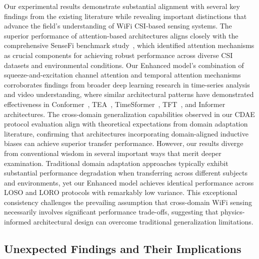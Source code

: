 \documentclass[journal]{IEEEtran}
\begin{document}
Our experimental results demonstrate substantial alignment with several key findings from the existing literature while revealing important distinctions that advance the field's understanding of WiFi CSI-based sensing systems. The superior performance of attention-based architectures aligns closely with the comprehensive SenseFi benchmark study~\cite{yang2023sensefi}, which identified attention mechanisms as crucial components for achieving robust performance across diverse CSI datasets and environmental conditions. Our Enhanced model's combination of squeeze-and-excitation channel attention and temporal attention mechanisms corroborates findings from broader deep learning research in time-series analysis and video understanding, where similar architectural patterns have demonstrated effectiveness in Conformer~\cite{gulati2020conformer}, TEA~\cite{li2020tea}, TimeSformer~\cite{bertasius2021timesformer}, TFT~\cite{lim2021tft}, and Informer~\cite{zhou2021informer} architectures. The cross-domain generalization capabilities observed in our CDAE protocol evaluation align with theoretical expectations from domain adaptation literature, confirming that architectures incorporating domain-aligned inductive biases can achieve superior transfer performance. However, our results diverge from conventional wisdom in several important ways that merit deeper examination. Traditional domain adaptation approaches typically exhibit substantial performance degradation when transferring across different subjects and environments, yet our Enhanced model achieves identical performance across LOSO and LORO protocols with remarkably low variance. This exceptional consistency challenges the prevailing assumption that cross-domain WiFi sensing necessarily involves significant performance trade-offs, suggesting that physics-informed architectural design can overcome traditional generalization limitations.

\subsection{Unexpected Findings and Their Implications}
\end{document}
